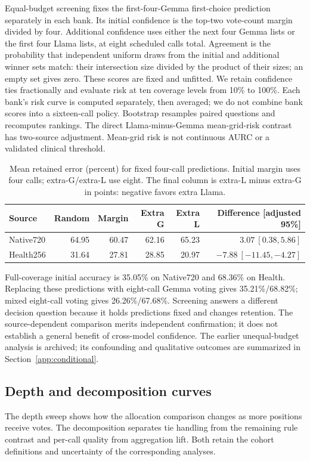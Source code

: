 \label{app:screening}
Equal-budget screening fixes the first-four-Gemma first-choice prediction separately in each bank. Its initial confidence is the top-two vote-count margin divided by four. Additional confidence uses either the next four Gemma lists or the first four Llama lists, at eight scheduled calls total. Agreement is the probability that independent uniform draws from the initial and additional winner sets match: their intersection size divided by the product of their sizes; an empty set gives zero. These scores are fixed and unfitted. We retain confidence ties fractionally and evaluate risk at ten coverage levels from 10\% to 100\%. Each bank's risk curve is computed separately, then averaged; we do not combine bank scores into a sixteen-call policy. Bootstrap resamples paired questions and recomputes rankings. The direct Llama-minus-Gemma mean-grid-risk contrast has two-source adjustment. Mean-grid risk is not continuous AURC or a validated clinical threshold.

\begin{table}[ht]
\centering\small
\caption{Mean retained error (percent) for fixed four-call predictions. Initial margin uses four calls; extra-G/extra-L use eight. The final column is extra-L minus extra-G in points: negative favors extra Llama.}
\begin{tabular}{lrrrrr}
\toprule
Source & Random & Margin & Extra G & Extra L & Difference [adjusted 95\%]\\
\midrule
Native720 & 64.95 & 60.47 & 62.16 & 65.23 & $3.07\ [0.38,5.86]$\\
Health256 & 31.64 & 27.81 & 28.85 & 20.97 & $-7.88\ [-11.45,-4.27]$\\
\bottomrule
\end{tabular}
\end{table}

Full-coverage initial accuracy is 35.05\% on Native720 and 68.36\% on Health. Replacing these predictions with eight-call Gemma voting gives 35.21\%/68.82\%; mixed eight-call voting gives 26.26\%/67.68\%. Screening answers a different decision question because it holds predictions fixed and changes retention. The source-dependent comparison merits independent confirmation; it does not establish a general benefit of cross-model confidence. The earlier unequal-budget analysis is archived; its confounding and qualitative outcomes are summarized in Section~\ref{app:conditional}.

\subsection{Depth and decomposition curves}
The depth sweep shows how the allocation comparison changes as more positions receive votes. The decomposition separates tie handling from the remaining rule contrast and per-call quality from aggregation lift. Both retain the cohort definitions and uncertainty of the corresponding analyses.

